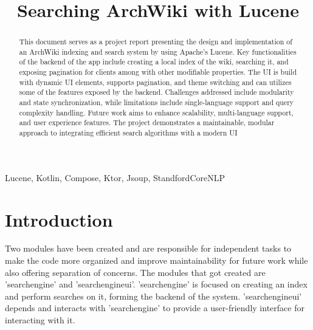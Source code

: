 \documentclass[conference]{IEEEtran}
\begin{document}
    \title{Searching ArchWiki with Lucene}

    \author{
    }

    \maketitle

    \begin{abstract}
        This document serves as a project report presenting the design and implementation of an ArchWiki indexing and search system by using Apache's Lucene.
        Key functionalities of the backend of the app include creating a local index of the wiki, searching it, and exposing pagination for clients among with other modifiable properties.
        The UI is build with dynamic UI elements, supports pagination, and theme switching and can utilizes some of the features exposed by the backend.
        Challenges addressed include modularity and state synchronization, while limitations include single-language support and query complexity handling.
        Future work aims to enhance scalability, multi-language support, and user experience features.
        The project demonstrates a maintainable, modular approach to integrating efficient search algorithms with a modern UI
    \end{abstract}

    \begin{IEEEkeywords}
        Lucene, Kotlin, Compose, Ktor, Jsoup, StandfordCoreNLP
    \end{IEEEkeywords}

    \section{Introduction}{Two modules have been created and are responsible for independent tasks to make the code more organized and improve maintainability for future work while also offering separation of concerns.
    The modules that got created are 'searchengine' and 'searchengineui'.
    'searchengine' is focused on creating an index and perform searches on it, forming the backend of the system.
    'searchengineui' depends and interacts with 'searchengine' to provide a user-friendly interface for interacting with it.}\label{sec:intro}
\end{document}

